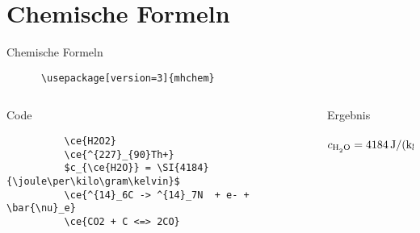 \section{Chemische Formeln}
\begin{frame}[fragile]{Chemische Formeln}
  \begin{Packages}
    \begin{lstlisting}
      \usepackage[version=3]{mhchem}
    \end{lstlisting}
  \end{Packages}
  \begin{columns}[onlytextwidth, t]
    \begin{column}{0.51\textwidth}
      \begin{block}{Code}
        \begin{lstlisting}
          \ce{H2O2}
          \ce{^{227}_{90}Th+}
          $c_{\ce{H2O}} = \SI{4184}{\joule\per\kilo\gram\kelvin}$
          \ce{^{14}_6C -> ^{14}_7N  + e- + \bar{\nu}_e}
          \ce{CO2 + C <=> 2CO}
        \end{lstlisting}
      \end{block}
    \end{column}
    \begin{column}{0.45\textwidth}
      \linespread{1.3}
      \begin{block}{Ergebnis}
         \\
         \\
        $c_{\ce{H2O}} = \SI{4184}{\joule\per\kilo\gram\per\kelvin}$ \\[0.3\baselineskip]
         \\[0.3\baselineskip]
      \end{block}
    \end{column}
  \end{columns}
\end{frame}
